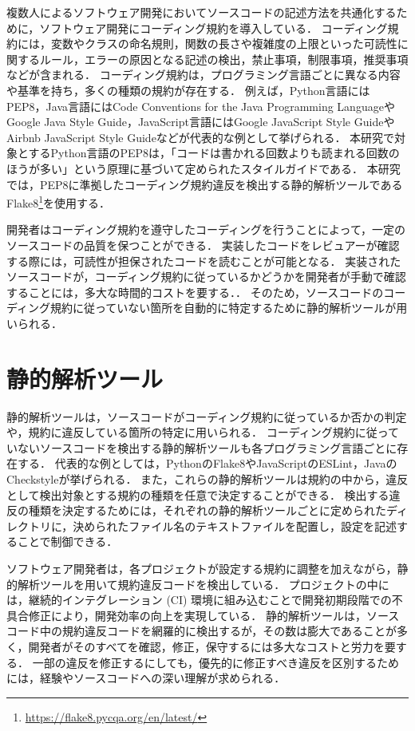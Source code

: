 \documentclass[11pt]{jreport}
\begin{document}
複数人によるソフトウェア開発においてソースコードの記述方法を共通化するために，ソフトウェア開発にコーディング規約を導入している．
コーディング規約には，変数やクラスの命名規則，関数の長さや複雑度の上限といった可読性に関するルール，エラーの原因となる記述の検出，禁止事項，制限事項，推奨事項などが含まれる．
コーディング規約は，プログラミング言語ごとに異なる内容や基準を持ち，多くの種類の規約が存在する．
例えば，Python言語にはPEP8，Java言語にはCode Conventions for the Java Programming LanguageやGoogle Java Style Guide，JavaScript言語にはGoogle JavaScript Style GuideやAirbnb JavaScript Style Guideなどが代表的な例として挙げられる．
本研究で対象とするPython言語のPEP8は，「コードは書かれる回数よりも読まれる回数のほうが多い」という原理に基づいて定められたスタイルガイドである．
本研究では，PEP8に準拠したコーディング規約違反を検出する静的解析ツールであるFlake8\footnote{\url{https://flake8.pycqa.org/en/latest/}}を使用する．

開発者はコーディング規約を遵守したコーディングを行うことによって，一定のソースコードの品質を保つことができる．
実装したコードをレビュアーが確認する際には，可読性が担保されたコードを読むことが可能となる．
実装されたソースコードが，コーディング規約に従っているかどうかを開発者が手動で確認することには，多大な時間的コストを要する．．
そのため，ソースコードのコーディング規約に従っていない箇所を自動的に特定するために静的解析ツールが用いられる．


\section{静的解析ツール}

静的解析ツールは，ソースコードがコーディング規約に従っているか否かの判定や，規約に違反している箇所の特定に用いられる．
コーディング規約に従っていないソースコードを検出する静的解析ツールも各プログラミング言語ごとに存在する．
代表的な例としては，PythonのFlake8やJavaScriptのESLint，JavaのCheckstyleが挙げられる．
また，これらの静的解析ツールは規約の中から，違反として検出対象とする規約の種類を任意で決定することができる．
検出する違反の種類を決定するためには，それぞれの静的解析ツールごとに定められたディレクトリに，決められたファイル名のテキストファイルを配置し，設定を記述することで制御できる．

ソフトウェア開発者は，各プロジェクトが設定する規約に調整を加えながら，静的解析ツールを用いて規約違反コードを検出している．
プロジェクトの中には，継続的インテグレーション (CI) 環境に組み込むことで開発初期段階での不具合修正により，開発効率の向上を実現している\cite{ci/cd}\cite{ci/cdpart2}．
静的解析ツールは，ソースコード中の規約違反コードを網羅的に検出するが，その数は膨大であることが多く，開発者がそのすべてを確認，修正，保守するには多大なコストと労力を要する\cite{UsingStaticAnalysisTools2}．
一部の違反を修正するにしても，優先的に修正すべき違反を区別するためには，経験やソースコードへの深い理解が求められる\cite{shuseisarenai}．
\end{document}
